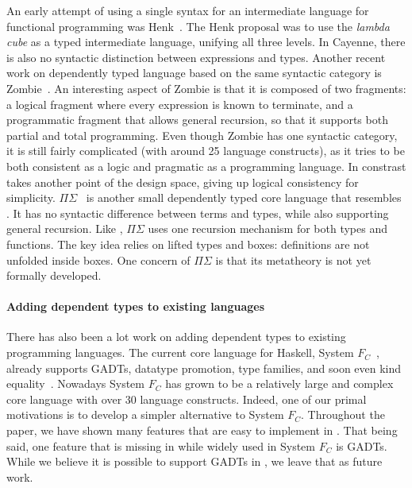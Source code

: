 An early attempt of using a single syntax for an intermediate language
for functional programming was Henk~\cite{pts:henk}. The Henk proposal
was to use the \emph{lambda cube} as a typed intermediate language,
unifying all three levels. In Cayenne, there is also no syntactic
distinction between expressions and types. Another recent work on
dependently typed language based on the same syntactic category is
\textsf{Zombie}~\cite{zombie:popl14, zombie:thesis}. An interesting
aspect of Zombie is that it is composed of two fragments: a logical
fragment where every expression is known to terminate, and a
programmatic fragment that allows general recursion, so that it
supports both partial and total programming. Even though Zombie has
one syntactic category, it is still fairly complicated (with around 25
language constructs), as it tries to be both consistent as a logic and
pragmatic as a programming language. In constrast \name takes another
point of the design space, giving up logical consistency for
simplicity. $\Pi\Sigma$~\cite{dep:pisigma} is another small
dependently typed core language that resembles \name. It has no
syntactic difference between terms and types, while also supporting
general recursion. Like \name, $\Pi\Sigma$ uses one recursion
mechanism for both types and functions. The key idea relies on lifted
types and boxes: definitions are not unfolded inside boxes. One
concern of $\Pi\Sigma$ is that its metatheory is not yet formally
developed.


\paragraph{Adding dependent types to existing languages}

There has also been a lot work on adding dependent types to existing
programming languages. The current core language for Haskell, System
$F_{C}$~\cite{Eisenberg:2014}, already supports GADTs, datatype
promotion, type families, and soon even kind
equality~\cite{fc:kind}. Nowadays System $F_{C}$ has grown to be a
relatively large and complex core language with over 30 language
constructs. Indeed, one of our primal motivations is to develop a
simpler alternative to System $F_C$. Throughout the paper, we have
shown many features that are easy to implement in \name. That being
said, one feature that is missing in \name while widely used in System
$F_C$ is GADTs. While we believe it is possible to support GADTs in
\name, we leave that as future work.

